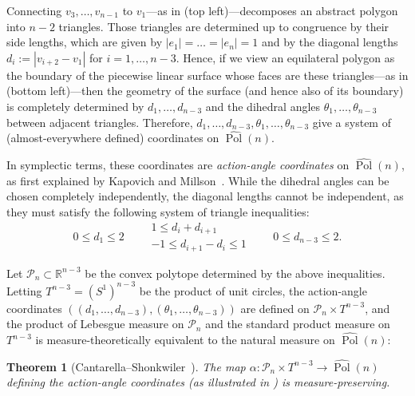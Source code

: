 \documentclass{article}
\newtheorem{theorem}{Theorem}
\theoremstyle{definition}
\newcommand{\R}{\mathbb{R}}
\newcommand{\Polhat}{\widehat{\operatorname{Pol}}}
\begin{document}
Connecting $v_3, \dots , v_{n-1}$ to $v_1$---as in  (top left)---decomposes an abstract polygon into $n-2$ triangles. Those triangles are determined up to congruence by their side lengths, which are given by $|e_1| = \dots = |e_n| = 1$ and by the diagonal lengths $d_i := |v_{i+2} - v_1|$ for $i=1, \dots , n-3$. Hence, if we view an equilateral polygon as the boundary of the piecewise linear surface whose faces are these triangles---as in  (bottom left)---then the geometry of the surface (and hence also of its boundary) is completely determined by $d_1, \dots , d_{n-3}$ and the dihedral angles $\theta_1, \dots , \theta_{n-3}$ between adjacent triangles. Therefore, $d_1, \dots , d_{n-3}, \theta_1, \dots , \theta_{n-3}$ give a system of (almost-everywhere defined) coordinates on $\Polhat(n)$.

In symplectic terms, these coordinates are \emph{action-angle coordinates} on $\Polhat(n)$, as first explained by Kapovich and Millson~\cite{kapovichSymplecticGeometryPolygons1996}. While the dihedral angles can be chosen completely independently, the diagonal lengths cannot be independent, as they must satisfy the following system of triangle inequalities:
\begin{equation}
0 \leq d_1 \leq 2
\qquad
\begin{matrix}
1 \leq d_i + d_{i+1} \\
-1 \leq d_{i+1} - d_i \leq 1
\end{matrix}
\qquad
0 \leq d_{n-3} \leq 2.
\label{eq:fan polytope}
\end{equation}

Let $\mathcal{P}_n \subset \R^{n-3}$ be the convex polytope determined by the above inequalities. Letting $T^{n-3} = (S^1)^{n-3}$ be the product of unit circles, the action-angle coordinates $((d_1, \dots , d_{n-3}),(\theta_1, \dots , \theta_{n-3}))$ are defined on $\mathcal{P}_n \times T^{n-3}$, and the product of Lebesgue measure on $\mathcal{P}_n$ and the standard product measure on $T^{n-3}$ is measure-theoretically equivalent to the natural measure on $\Polhat(n)$:

 \begin{theorem}[{Cantarella--Shonkwiler~\cite{cantarellaSymplecticGeometryClosed2016}}]\label{thm:measure equivalence}
	The map $\alpha: \mathcal{P}_n \times T^{n-3} \to \Polhat(n)$ defining the action-angle coordinates (as illustrated in ) is measure-preserving.
\end{theorem}
\end{document}
